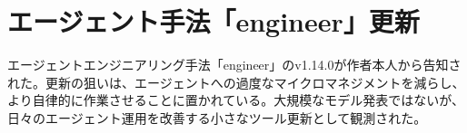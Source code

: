 \section{エージェント手法「engineer」更新}
エージェントエンジニアリング手法「engineer」のv1.14.0が作者本人から告知された。更新の狙いは、エージェントへの過度なマイクロマネジメントを減らし、より自律的に作業させることに置かれている。大規模なモデル発表ではないが、日々のエージェント運用を改善する小さなツール更新として観測された。
